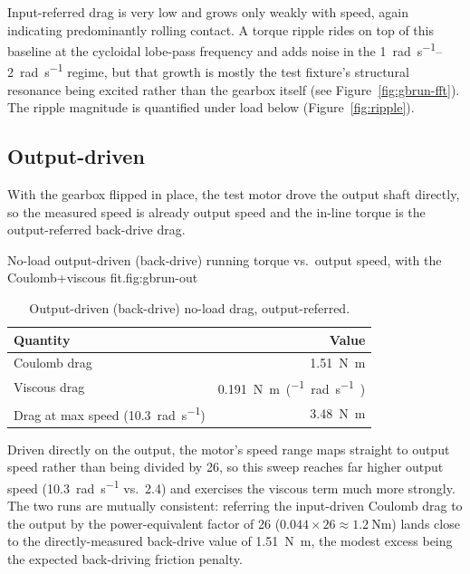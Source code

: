 \documentclass[11pt]{article}
\begin{document}
Input-referred drag is very low and
grows only weakly with speed, again indicating predominantly rolling contact. A
torque ripple rides on top of this baseline at the cycloidal lobe-pass frequency
and adds noise in the \SIrange{1}{2}{\radian\per\second} regime, but that growth is mostly the test
fixture's structural resonance being excited rather than the gearbox itself (see
Figure~\ref{fig:gbrun-fft}). The ripple magnitude is quantified under load below
(Figure~\ref{fig:ripple}).

\subsection{Output-driven}
With the gearbox flipped in place, the test motor drove the output shaft directly,
so the measured speed is already output speed and the in-line torque is the
output-referred back-drive drag.

  {No-load output-driven (back-drive) running torque vs.\ output speed, with the
   Coulomb+viscous fit.}{fig:gbrun-out}

\begin{table}[H]
  \centering
  \caption{Output-driven (back-drive) no-load drag, output-referred.}
  \begin{tabular}{lr}
    \toprule
    Quantity & Value\\
    \midrule
    Coulomb drag         & \SI{1.51}{\newton\meter}\\
    Viscous drag         & \SI{0.191}{\newton\meter\per(\radian\per\second)}\\
    Drag at max speed (\SI{10.3}{\radian\per\second}) & \SI{3.48}{\newton\meter}\\
    \bottomrule
  \end{tabular}
\end{table}

Driven directly on the output, the motor's speed range maps straight to output
speed rather than being divided by 26, so this sweep reaches far higher output
speed (\SI{10.3}{\radian\per\second} vs.\ \SI{2.4}{}) and exercises the viscous
term much more strongly. The two runs
are mutually consistent: referring the input-driven Coulomb drag to the output by
the power-equivalent factor of 26 ($0.044\times26\approx\SI{1.2}{\newton\meter}$)
lands close to the directly-measured back-drive value of \SI{1.51}{\newton\meter},
the modest excess being the expected back-driving friction penalty.
\end{document}
